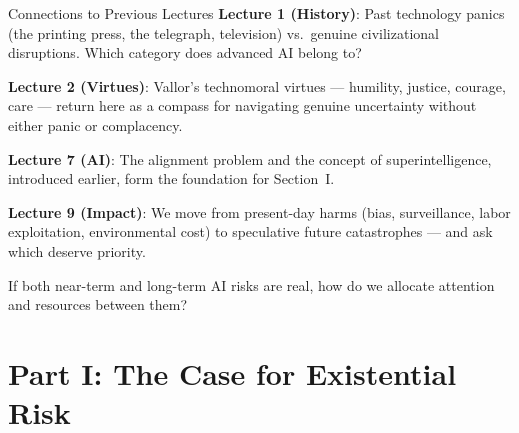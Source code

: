\documentclass[aspectratio=169,11pt]{beamer}
\begin{document}
\begin{frame}[shrink=4]{Connections to Previous Lectures}
\textbf{Lecture 1 (History)}: Past technology panics (the printing press, the telegraph, television) vs.\ genuine civilizational disruptions. Which category does advanced AI belong to?

\vspace{0.2cm}
\textbf{Lecture 2 (Virtues)}: Vallor's technomoral virtues --- humility, justice, courage, care --- return here as a compass for navigating genuine uncertainty without either panic or complacency.

\vspace{0.2cm}
\textbf{Lecture 7 (AI)}: The alignment problem and the concept of superintelligence, introduced earlier, form the foundation for Section~I.

\vspace{0.2cm}
\textbf{Lecture 9 (Impact)}: We move from present-day harms (bias, surveillance, labor exploitation, environmental cost) to speculative future catastrophes --- and ask which deserve priority.

\begin{discussionbox}[Discussion]
If both near-term and long-term AI risks are real, how do we allocate attention and resources between them?
\end{discussionbox}
\end{frame}

\section{Part I: The Case for Existential Risk}
\end{document}
